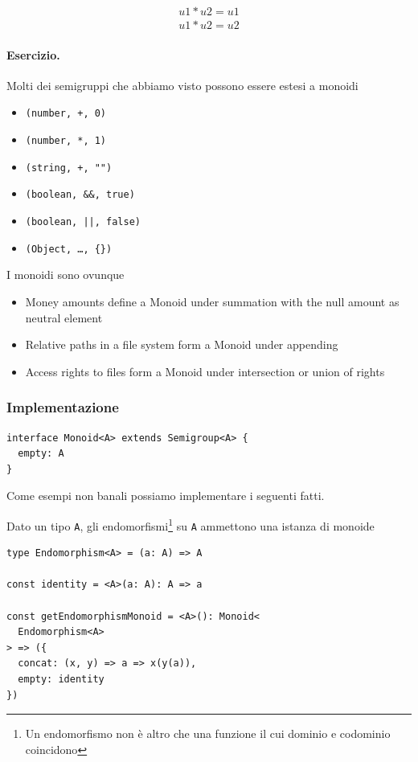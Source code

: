 \documentclass[12pt]{article}
\begin{document}
\begin{eqnarray}
u1 * u2 = u1 \\
u1 * u2 = u2
\end{eqnarray}

\paragraph{Esercizio.} Molti dei semigruppi che abbiamo visto possono essere estesi a monoidi

\begin{itemize}
  \item \texttt{(number, +, 0)}
  \item \texttt{(number, *, 1)}
  \item \texttt{(string, +, "")}
  \item \texttt{(boolean, \&\&, true)}
  \item \texttt{(boolean, ||, false)}
  \item \texttt{(Object, \ldots, \{\})}
\end{itemize}

I monoidi sono ovunque

\begin{itemize}
  \item Money amounts define a Monoid under summation with the null amount as neutral element
  \item Relative paths in a file system form a Monoid under appending
  \item Access rights to files form a Monoid under intersection or union of rights
\end{itemize}

\subsubsection{Implementazione}

\begin{verbatim}
interface Monoid<A> extends Semigroup<A> {
  empty: A
}
\end{verbatim}

Come esempi non banali possiamo implementare i seguenti fatti.

Dato un tipo \texttt{A}, gli endomorfismi\footnote{Un endomorfismo non è altro che una funzione il cui dominio e codominio coincidono}
su \texttt{A} ammettono una istanza di monoide

\begin{verbatim}
type Endomorphism<A> = (a: A) => A

const identity = <A>(a: A): A => a

const getEndomorphismMonoid = <A>(): Monoid<
  Endomorphism<A>
> => ({
  concat: (x, y) => a => x(y(a)),
  empty: identity
})
\end{verbatim}
\end{document}
